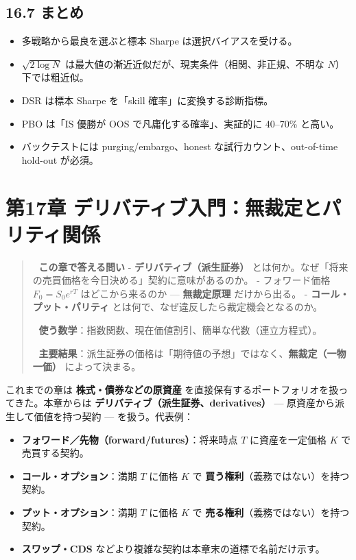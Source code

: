 \documentclass[11pt,a4paper]{report}
\begin{document}
\section{16.7 まとめ}

\begin{itemize}
\item 多戦略から最良を選ぶと標本 Sharpe は選択バイアスを受ける。
\item $\sqrt{2 \log N}$ は最大値の漸近近似だが、現実条件（相関、非正規、不明な $N$）下では粗近似。
\item DSR は標本 Sharpe を「skill 確率」に変換する診断指標。
\item PBO は「IS 優勝が OOS で凡庸化する確率」、実証的に 40–70\% と高い。
\item バックテストには purging/embargo、honest な試行カウント、out-of-time hold-out が必須。
\end{itemize}

\noindent\hrulefill

\chapter{第17章 デリバティブ入門：無裁定とパリティ関係}

\begin{quote}
🎯 \textbf{この章で答える問い}
- \textbf{デリバティブ（派生証券）} とは何か。なぜ「将来の売買価格を今日決める」契約に意味があるのか。
- フォワード価格 $F_0 = S_0 e^{rT}$ はどこから来るのか — \textbf{無裁定原理} だけから出る。
- \textbf{コール・プット・パリティ} とは何で、なぜ違反したら裁定機会となるのか。

📐 \textbf{使う数学}：指数関数、現在価値割引、簡単な代数（連立方程式）。

🔑 \textbf{主要結果}：派生証券の価格は「期待値の予想」ではなく、\textbf{無裁定（一物一価）} によって決まる。
\end{quote}

これまでの章は \textbf{株式・債券などの原資産} を直接保有するポートフォリオを扱ってきた。本章からは \textbf{デリバティブ（派生証券、derivatives）} — 原資産から派生して価値を持つ契約 — を扱う。代表例：

\begin{itemize}
\item \textbf{フォワード／先物（forward/futures）}：将来時点 $T$ に資産を一定価格 $K$ で売買する契約。
\item \textbf{コール・オプション}：満期 $T$ に価格 $K$ で \textbf{買う権利}（義務ではない）を持つ契約。
\item \textbf{プット・オプション}：満期 $T$ に価格 $K$ で \textbf{売る権利}（義務ではない）を持つ契約。
\item \textbf{スワップ・CDS} などより複雑な契約は本章末の道標で名前だけ示す。
\end{itemize}
\end{document}
